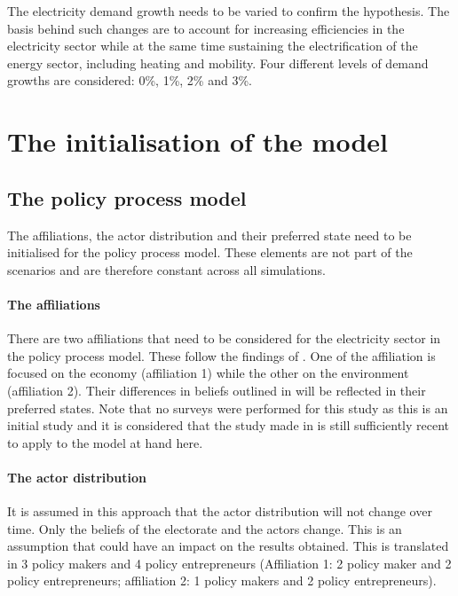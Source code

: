The electricity demand growth needs to be varied to confirm the hypothesis. The basis behind such changes are to account for increasing efficiencies in the electricity sector while at the same time sustaining the electrification of the energy sector, including heating and mobility. Four different levels of demand growths are considered: 0\%, 1\%, 2\% and 3\%. 



\section{The initialisation of the model}
\label{sec:initialisation}

\subsection{The policy process model}

The affiliations, the actor distribution and their preferred state need to be initialised for the policy process model. These elements are not part of the scenarios and are therefore constant across all simulations.

\paragraph{The affiliations}

There are two affiliations that need to be considered for the electricity sector in the policy process model. These follow the findings of \cite{markard2016socio}. One of the affiliation is focused on the economy (affiliation 1) while the other on the environment (affiliation 2). Their differences in beliefs outlined in \cite{markard2016socio} will be reflected in their preferred states. Note that no surveys were performed for this study as this is an initial study and it is considered that the study made in \cite{markard2016socio} is still sufficiently recent to apply to the model at hand here.


\paragraph{The actor distribution}

It is assumed in this approach that the actor distribution will not change over time. Only the beliefs of the electorate and the actors change. This is an assumption that could have an impact on the results obtained. This is translated in 3 policy makers and 4 policy entrepreneurs (Affiliation 1: 2 policy maker and 2 policy entrepreneurs; affiliation 2: 1 policy makers and 2 policy entrepreneurs).

